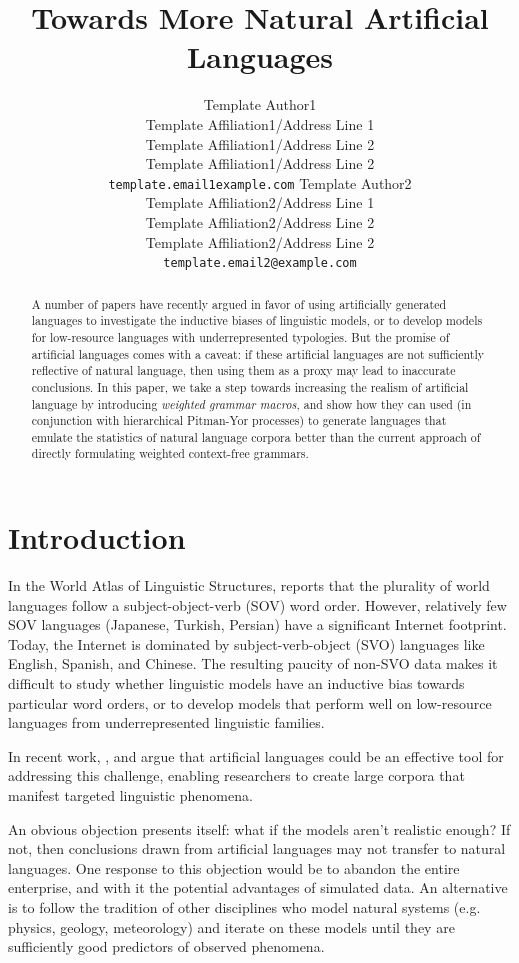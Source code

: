 \documentclass[11pt,a4paper]{article}
\title{Towards More Natural Artificial Languages}
\author{
  Template Author1\Thanks{The {\em actual} contributors to this instruction
    document and corresponding template file are given in Section
    \ref{sec:contributors}.} 
  \\
  Template Affiliation1/Address Line 1
  \\
  Template Affiliation1/Address Line 2
  \\
  Template Affiliation1/Address Line 2
  \\
  \texttt{template.email1example.com}
  \And
  Template Author2 
  \\
  Template Affiliation2/Address Line 1
  \\
  Template Affiliation2/Address Line 2
  \\
  Template Affiliation2/Address Line 2
  \\
  \texttt{template.email2@example.com}
}
\date{}
\begin{document}
\maketitle
\begin{abstract}
A number of papers have recently argued in favor of using artificially generated languages to investigate the inductive biases of linguistic models, or to develop models for low-resource languages with underrepresented typologies. But the promise of artificial languages comes with a caveat: if these artificial languages are not sufficiently reflective of natural language, then using them as a proxy may lead to inaccurate conclusions. In this paper, we take a step towards increasing the realism of artificial language by introducing \emph{weighted grammar macros}, and show how they can used (in conjunction with hierarchical Pitman-Yor processes) to generate languages that emulate the statistics of natural language corpora better than the current approach of directly formulating weighted context-free grammars. 
\end{abstract}

\section{Introduction}

In the World Atlas of Linguistic Structures, \citet{wals81} reports that the plurality of world languages follow a subject-object-verb (SOV) word order. However, relatively few SOV languages (Japanese, Turkish, Persian) have a significant Internet footprint. Today, the Internet is dominated by subject-verb-object (SVO) languages like English, Spanish, and Chinese. The resulting paucity of non-SVO data makes it difficult to study whether linguistic models have an inductive bias towards particular word orders, or to develop models that perform well on low-resource languages from underrepresented linguistic families.

In recent work, \citet{wang-eisner-2016-galactic}, \citet{ravfogel-etal-2019-studying} and \citet{white-cotterell-2021-examining} argue that artificial languages could be an effective tool for addressing this challenge, enabling researchers to create large corpora that manifest targeted linguistic phenomena.

An obvious objection presents itself: what if the models aren't realistic enough? If not, then conclusions drawn from artificial languages may not transfer to natural languages. One response to this objection would be to abandon the entire enterprise, and with it the potential advantages of simulated data. An alternative is to follow the tradition of other disciplines who model natural systems (e.g. physics, geology, meteorology) and iterate on these models until they are sufficiently good predictors of observed phenomena.
\end{document}
